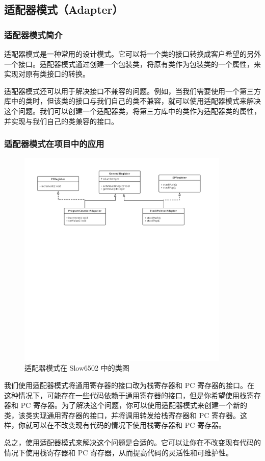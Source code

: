 \subsection{适配器模式（Adapter）}

\subsubsection{适配器模式简介}

适配器模式是一种常用的设计模式。它可以将一个类的接口转换成客户希望的另外一个接口。适配器模式通过创建一个包装类，将原有类作为包装类的一个属性，来实现对原有类接口的转换。

适配器模式还可以用于解决接口不兼容的问题。例如，当我们需要使用一个第三方库中的类时，但该类的接口与我们自己的类不兼容，就可以使用适配器模式来解决这个问题。我们可以创建一个适配器类，将第三方库中的类作为适配器类的属性，并实现与我们自己的类兼容的接口。

\subsubsection{适配器模式在项目中的应用}

\begin{figure}[H]
  \centering
  \includegraphics[width=0.9\textwidth]{figures/适配器模式.pdf}
  \caption{适配器模式在 Slow6502 中的类图}
\end{figure}

我们使用适配器模式将通用寄存器的接口改为栈寄存器和 PC 寄存器的接口。在这种情况下，可能存在一些代码依赖于通用寄存器的接口，但是你希望使用栈寄存器和 PC 寄存器。为了解决这个问题，你可以使用适配器模式来创建一个新的类，该类实现通用寄存器的接口，并将调用转发给栈寄存器和 PC 寄存器。这样，你就可以在不改变现有代码的情况下使用栈寄存器和 PC 寄存器。

总之，使用适配器模式来解决这个问题是合适的。它可以让你在不改变现有代码的情况下使用栈寄存器和 PC 寄存器，从而提高代码的灵活性和可维护性。

